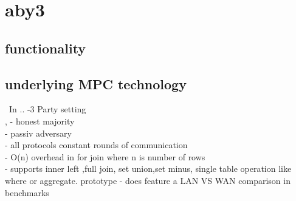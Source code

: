 \section{aby3}


\subsection{functionality}


\subsection{underlying MPC technology}



\
In \cite{10.1145/3372297.3423358} ..
-3 Party setting \\, 
- honest majority \\ 
- passiv adversary \\
- all protocols constant rounds of communication \\
- O(n) overhead in for join where n is number of rows \\
- supports inner left ,full join, set union,set minus, single table operation like where or aggregate. prototype 
- does feature a LAN VS WAN comparison in benchmarks

  